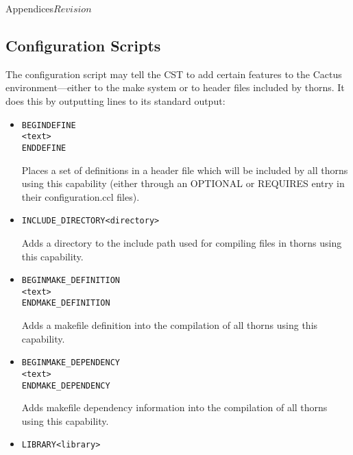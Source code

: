\begin{cactuspart}{Appendices}{}{$Revision$}
\subsection{Configuration Scripts}
\label{sec:Appendix.configuration.ccl.configscript}

The configuration script may tell the CST to add certain features to
the Cactus environment---either to the make system or to header
files included by thorns.  It does this by outputting lines to its
standard output:

\begin{itemize}


\item

\begin{alltt}
BEGIN DEFINE 
<text>
END DEFINE
\end{alltt}

Places a set of definitions in a header file which will be included by
all thorns using this capability (either through an OPTIONAL or
REQUIRES entry in their configuration.ccl files).

\item

\begin{alltt}
INCLUDE_DIRECTORY  <directory>
\end{alltt}

Adds a directory to the include path used for compiling files in
thorns using this capability.

\item

\begin{alltt}
BEGIN MAKE_DEFINITION 
<text>
END MAKE_DEFINITION
\end{alltt}

Adds a makefile definition into the compilation of all thorns using
this capability.

\item

\begin{alltt}
BEGIN MAKE_DEPENDENCY 
<text>
END MAKE_DEPENDENCY 
\end{alltt}

Adds makefile dependency information into the compilation of all
thorns using this capability.

\item

\begin{alltt}
LIBRARY <library>
\end{alltt}


\end{itemize}
\end{cactuspart}
